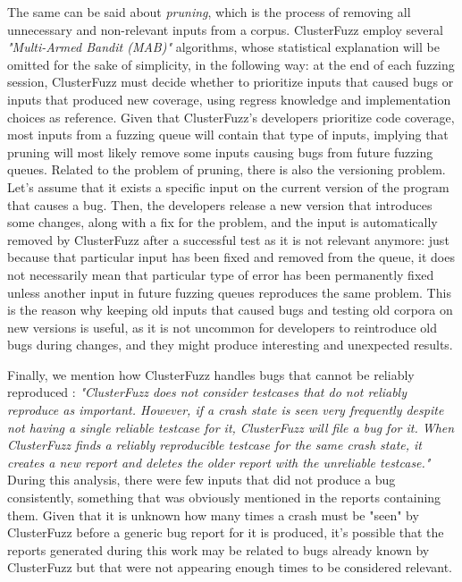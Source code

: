\newline
The same can be said about \textit{pruning}, which is the process of removing all unnecessary and non-relevant inputs from a corpus. ClusterFuzz employ several \textit{"Multi-Armed Bandit (MAB)"} \cite{mab} algorithms, whose statistical explanation will be omitted for the sake of simplicity, in the following way: at the end of each fuzzing session, ClusterFuzz must decide whether to prioritize inputs that caused bugs or inputs that produced new coverage, using regress knowledge and implementation choices as reference. Given that ClusterFuzz's developers prioritize code coverage, most inputs from a fuzzing queue will contain that type of inputs, implying that pruning will most likely remove some inputs causing bugs from future fuzzing queues.
\newline \newline
Related to the problem of pruning, there is also the versioning problem.
\newline
Let's assume that it exists a specific input on the current version of the program that causes a bug. Then, the developers release a new version that introduces some changes, along with a fix for the problem, and the input is automatically removed by ClusterFuzz after a successful test as it is not relevant anymore: just because that particular input has been fixed and removed from the queue, it does not necessarily mean that particular type of error has been permanently fixed unless another input in future fuzzing queues reproduces the same problem. This is the reason why keeping old inputs that caused bugs and testing old corpora on new versions is useful, as it is not uncommon for developers to reintroduce old bugs during changes, and they might produce interesting and unexpected results.


\newpage
Finally, we mention how ClusterFuzz handles bugs that cannot be reliably reproduced \cite{unreliable}: 
\newline \newline
\textit{"ClusterFuzz does not consider testcases that do not reliably reproduce as important. However, if a crash state is seen very frequently despite not having a single reliable testcase for it, ClusterFuzz will file a bug for it. When ClusterFuzz finds a reliably reproducible testcase for the same crash state, it creates a new report and deletes the older report with the unreliable testcase."}
\newline \newline
During this analysis, there were few inputs that did not produce a bug consistently, something that was obviously mentioned in the reports containing them. Given that it is unknown how many times a crash must be "seen" by ClusterFuzz before a generic bug report for it is produced, it's possible that the reports generated during this work may be related to bugs already known by ClusterFuzz but that were not appearing enough times to be considered relevant.


